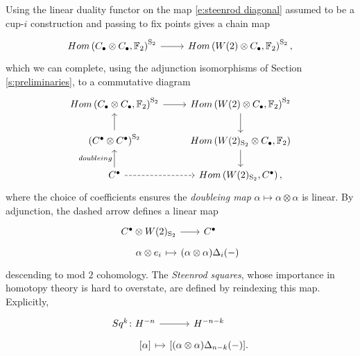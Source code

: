 Using the linear duality functor on the map \eqref{e:steenrod diagonal} assumed to be a cup-$i$ construction and passing to fix points gives a chain map
\begin{equation*}
\begin{tikzcd}
Hom\left(C_\bullet \otimes C_\bullet, \F_2 \right)^{\mathrm S_2} \arrow[r] &
Hom\left(W(2) \otimes C_\bullet, \F_2 \right)^{\mathrm S_2},
\end{tikzcd}
\end{equation*}
which we can complete, using the adjunction isomorphisms of Section \ref{s:preliminaries}, to a commutative diagram
\begin{equation*}
\begin{tikzcd}
Hom\left(C_\bullet \otimes C_\bullet, \F_2 \right)^{\mathrm S_2} \arrow[r] &
Hom\left(W(2) \otimes C_\bullet, \F_2 \right)^{\mathrm S_2} \arrow[d] \\
\left(C^\bullet \otimes C^\bullet\right)^{\mathrm S_2} \arrow[u]&
Hom\left(W(2)_{\mathrm S_2} \otimes C_\bullet, \F_2 \right) \arrow[d] \\
C^\bullet \arrow[u, "doubleing"] \arrow[r, dashed]&
Hom\left(W(2)_{\mathrm S_2}, C^\bullet\right),
\end{tikzcd}
\end{equation*}
where the choice of coefficients ensures the \textit{doubleing map} $\alpha \mapsto \alpha \otimes \alpha$ is linear.
By adjunction, the dashed arrow defines a linear map
\begin{equation} \label{e:Steenrod squares parameterized}
\begin{tikzcd}[row sep=tiny, column sep = tiny]
C^\bullet \otimes W(2)_{\mathrm S_2} \arrow[r] &[-10pt] C^\bullet \\
\alpha \otimes e_i \arrow[r, |->] & (\alpha \otimes \alpha)\Delta_i(-)
\end{tikzcd}
\end{equation}
descending to mod $2$ cohomology.
The \textit{Steenrod squares}, whose importance in homotopy theory is hard to overstate, are defined by reindexing this map.
Explicitly,
\begin{equation*}
\begin{tikzcd}[row sep=tiny, column sep=tiny]
Sq^k \colon H^{-n} \arrow[r] & H^{-n-k} \\
\phantom{Sq^k \colon}{[\alpha]} \arrow[r, |->] & {\left[(\alpha \otimes \alpha)\Delta_{n-k}(-) \right]}.
\end{tikzcd}
\end{equation*}

